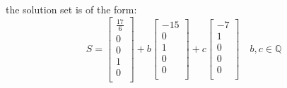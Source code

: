 \documentclass[a4paper,10pt]{article}
\begin{document}
the solution set is of the form:
\[
S= 
\begin{bmatrix}
 \frac{17}{6}\\ 0\\0\\1\\0\\
\end{bmatrix}
+b
\begin{bmatrix}
 -15\\0\\1\\0\\0\\
\end{bmatrix}
+c
\begin{bmatrix}
 -7\\1\\0\\0\\0\\
\end{bmatrix}
\quad b,c \in \mathbb{Q}
\]
\end{document}
